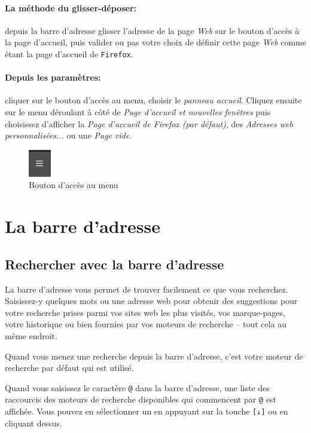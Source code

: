\documentclass[a4paper,11pt]{book}
\begin{document}
\paragraph*{La méthode du glisser-déposer:} depuis la barre d'adresse glisser l'adresse de la page \textit{Web} sur le bouton d'accès à la page d'accueil, puis valider ou pas votre choix de définir cette page \textit{Web} comme étant la page d'accueil de \texttt{Firefox}.
\medskip

\paragraph*{Depuis les paramètres:} cliquer sur le bouton d'accès au menu, choisir le \textit{panneau accueil}. Cliquez ensuite sur le menu déroulant à côté de \textit{Page d’accueil et nouvelles fenêtres} puis choisissez d’afficher la \textit{Page d’accueil de Firefox (par défaut)}, des \textit{Adresses web personnalisées...} ou une \textit{Page vide}.
\begin{figure}[h]
\begin{center}
\includegraphics[scale=0.5]{IMG/002--Bouton_menu.png}
\caption{Bouton d'accès au menu}
\end{center}
\end{figure}
\medskip

\section{La barre d'adresse}
\subsection*{Rechercher avec la barre d'adresse}
La barre d’adresse vous permet de trouver facilement ce que vous recherchez. Saisissez-y quelques mots ou une adresse web pour obtenir des suggestions pour votre recherche prises parmi vos sites web les plus visités, vos marque-pages, votre historique ou bien fournies par vos moteurs de recherche – tout cela au même endroit. 
\medskip

Quand vous menez une recherche depuis la barre d’adresse, c’est votre moteur de recherche par défaut qui est utilisé.
\medskip

Quand vous saisissez le caractère \texttt{@} dans la barre d’adresse, une liste des raccourcis des moteurs de recherche disponibles qui commencent par \texttt{@} est affichée. Vous pouvez en sélectionner un en appuyant sur la touche \texttt{[↓]} ou en cliquant dessus.
\medskip
 
\end{document}
